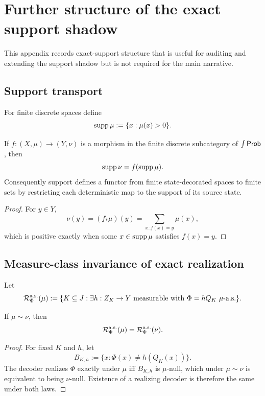 \section{Further structure of the exact support shadow}
\label{app:exact-shadow-details}

This appendix records exact-support structure that is useful for auditing and extending the support shadow but is not required for the main narrative.

\subsection{Support transport}

For finite discrete spaces define
\[
\operatorname{supp}\mu:=\{x:\mu(x)>0\}.
\]

\begin{proposition}
\label{prop:app-support-shadow-functor}
If $f:(X,\mu)\to(Y,\nu)$ is a morphism in the finite discrete subcategory of $\int\mathsf{Prob}$, then
\[
\operatorname{supp}\nu=f(\operatorname{supp}\mu).
\]
Consequently support defines a functor from finite state-decorated spaces to finite sets by restricting each deterministic map to the support of its source state.
\end{proposition}

\begin{proof}
For $y\in Y$,
\[
\nu(y)
=(f_*\mu)(y)
=\sum_{x:f(x)=y}\mu(x),
\]
which is positive exactly when some $x\in\operatorname{supp}\mu$ satisfies $f(x)=y$.
\end{proof}

\subsection{Measure-class invariance of exact realization}

Let
\[
\Rcal^{\mathrm{a.s.}}_\Phi(\mu)
:=
\{K\subseteq J:\exists h:Z_K\to Y\text{ measurable with }\Phi=hQ_K\ \mu\text{-a.s.}\}.
\]

\begin{proposition}
\label{thm:app-measure-class-invariance}
If $\mu\sim\nu$, then
\[
\mathcal{R}^{\mathrm{a.s.}}_\Phi(\mu)
=
\mathcal{R}^{\mathrm{a.s.}}_\Phi(\nu).
\]
\end{proposition}

\begin{proof}
For fixed $K$ and $h$, let
\[
B_{K,h}:=\{x:\Phi(x)\neq h(Q_K(x))\}.
\]
The decoder realizes $\Phi$ exactly under $\mu$ iff $B_{K,h}$ is $\mu$-null, which under $\mu\sim\nu$ is equivalent to being $\nu$-null. Existence of a realizing decoder is therefore the same under both laws.
\end{proof}

